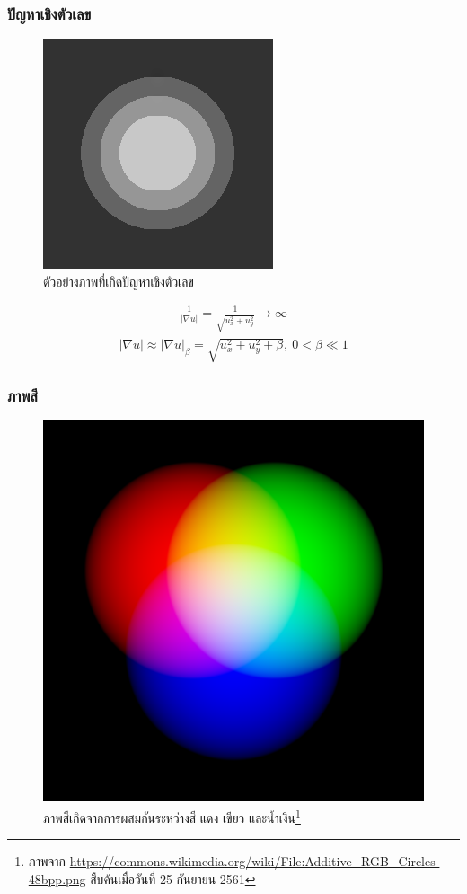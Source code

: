 \documentclass[xcolor=dvipsnames, xetex,serif]{beamer}
\numberwithin{equation}{section}
\begin{document}
		\begin{frame}
			\frametitle{ปัญหาเชิงตัวเลข}
			\begin{figure}[H]
				\centering
				\includegraphics[width=0.2\linewidth]{images/grayscale_inpaint/result_splitbergman.png}
				\caption{ตัวอย่างภาพที่เกิดปัญหาเชิงตัวเลข}
				\label{image:rgb-space}
			\end{figure}
			\begin{align*}
			\tfrac{1}{| \nabla u |}=\tfrac{1}{\sqrt{u_x^2+u_y^2}} \rightarrow \infty
			\end{align*}
			\begin{align*}
			|\nabla u| \approx| \nabla u |_\beta=\sqrt{u_x^2+u_y^2+\beta},\ 0< \beta \ll 1
			\end{align*}
		\end{frame} 
		\begin{frame}
			\frametitle{ภาพสี}
			\begin{figure}[H]
				\centering
				\includegraphics[width=0.4\linewidth]{images/rgb-space.png}
				\caption{ภาพสีเกิดจากการผสมกันระหว่างสี แดง เขียว และน้ำเงิน\footnote{\tiny{ภาพจาก \url{https://commons.wikimedia.org/wiki/File:Additive_RGB_Circles-48bpp.png}  สืบค้นเมื่อวันที่ 25 กันยายน 2561}}}
				\label{image:rgb-space}
			\end{figure}
		\end{frame}
\end{document}
